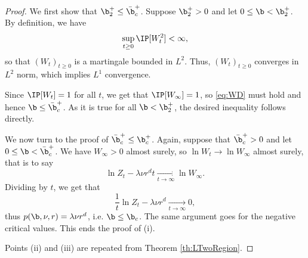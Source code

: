 \begin{proof}
We first show that $\b_2^+ \leq {\bar{\b}_c}^+$.
Suppose $\b_2^+>0$ and let $0\leq \b < \b_2^+$. By definition, we have
\[\sup_{t\geq 0} \IP [W_t^2] < \infty,\]
so that $(W_t)_{t\geq 0}$ is a martingale bounded in $L^2$. Thus, $(W_t)_{t\geq 0}$ converges in $L^2$ norm, which implies $L^1$ convergence.

Since $\IP [W_t] = 1$ for all $t$, we get that $\IP [W_\infty] = 1$, so \eqref{eq:WD} must hold and hence $\b \leq {\bar{\b}_c}^+$. As it is true for all $\b<\b_2^+$, the desired inequality follows directly.

We now turn to the proof of ${\bar{\b}_c}^+ \leq \b_c^+$. Again, suppose that ${\bar{\b}_c}^+>0$ and let $0\leq \b < {\bar{\b}_c}^+$. We have $W_\infty >0$ almost surely, so $\ln W_t \to \ln W_\infty$ almost surely, that is to say
\[\ln Z_t - \lambda \nu r^d t \underset{t\to\infty}{\longrightarrow} \ln W_\infty.\]
Dividing by $t$, we get that
\[\frac{1}{t}\ln Z_t - \lambda \nu r^d \underset{t\to\infty}{\longrightarrow} 0,\]
thus $p(\b, \nu, r) = \lambda \nu r^d$, i.e. $\b \leq \b_c$.
The same argument goes for the negative critical values. This ends the proof of (i).

Points (ii) and (iii) are repeated from Theorem \ref{th:LTwoRegion}. 
\end{proof}




 

 